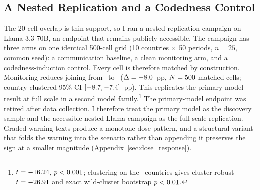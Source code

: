 \documentclass[12pt]{article}
\begin{document}
\subsection{A Nested Replication and a Codedness Control}

The 20-cell overlap is thin support, so I ran a nested replication campaign on Llama 3.3 70B, an endpoint that remains publicly accessible. The campaign has three arms on one identical 500-cell grid (10 countries $\times$ 50 periods, $n = 25$, common seed): a communication baseline, a clean monitoring arm, and a codedness-induction control. Every cell is therefore matched by construction. Monitoring reduces joining from \NestedCommMeanJoinPct\ to \NestedSurvMeanJoinPct\ ($\Delta = -8.0$~pp, $N = 500$ matched cells; country-clustered 95\% CI $[-8.7, -7.4]$~pp). This replicates the primary-model result at full scale in a second model family.\footnote{$t = -16.24$, $p <0.001$; clustering on the \NestedSurvCCG\ countries gives cluster-robust $t = -26.91$ and exact wild-cluster bootstrap $p <0.01$.} The primary-model endpoint was retired after data collection. I therefore treat the primary model as the discovery sample and the accessible nested Llama campaign as the full-scale replication. Graded warning texts produce a monotone dose pattern, and a structural variant that folds the warning into the scenario rather than appending it preserves the sign at a smaller magnitude (Appendix~\ref{sec:dose_response}).
\end{document}
